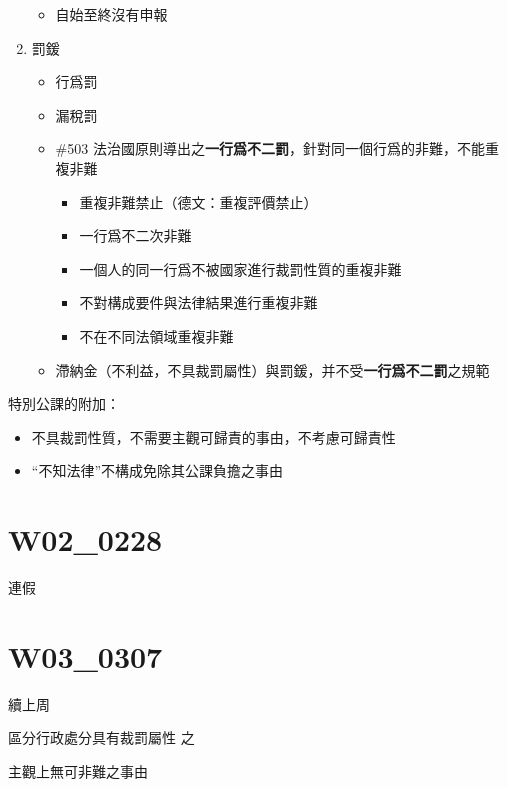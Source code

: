 \documentclass[]{ctexbook}
\providecommand{\tightlist}{%
  \setlength{\itemsep}{0pt}\setlength{\parskip}{0pt}}
\begin{document}
\begin{enumerate}
  \begin{itemize}
  \tightlist
  \item
    自始至終沒有申報
  \end{itemize}
\item
  罰鍰

  \begin{itemize}
  \tightlist
  \item
    行爲罰
  \item
    漏稅罰
  \item
    \#503 法治國原則導出之\textbf{一行爲不二罰}，針對同一個行爲的非難，不能重複非難

    \begin{itemize}
    \tightlist
    \item
      重複非難禁止（德文：重複評價禁止）
    \item
      一行爲不二次非難
    \item
      一個人的同一行爲不被國家進行裁罰性質的重複非難
    \item
      不對構成要件與法律結果進行重複非難
    \item
      不在不同法領域重複非難
    \end{itemize}
  \item
    滯納金（不利益，不具裁罰屬性）與罰鍰，并不受\textbf{一行爲不二罰}之規範
  \end{itemize}
\end{enumerate}

特別公課的附加：

\begin{itemize}
\tightlist
\item
  不具裁罰性質，不需要主觀可歸責的事由，不考慮可歸責性
\item
  ``不知法律''不構成免除其公課負擔之事由
\end{itemize}

\hypertarget{w02_0228}{%
\chapter{W02\_0228}\label{w02_0228}}

連假

\hypertarget{w03_0307}{%
\chapter{W03\_0307}\label{w03_0307}}

續上周

區分行政處分具有裁罰屬性 之

主觀上無可非難之事由
\end{document}
